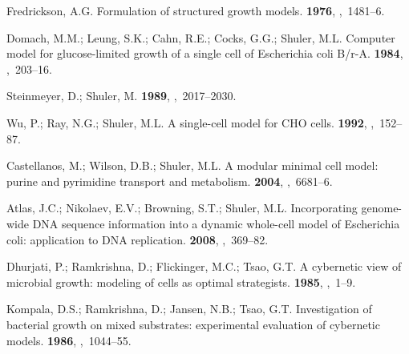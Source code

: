 \documentclass[processes,article,accept,moreauthors,pdftex,12pt,a4paper]{mdpi}
\begin{document}
\begin{thebibliography}{----}
\providecommand{\natexlab}[1]{#1}

Fredrickson, A.G.
\newblock Formulation of structured growth models.
 {\bf 1976},
,~1481--6.

Domach, M.M.; Leung, S.K.; Cahn, R.E.; Cocks, G.G.; Shuler, M.L.
\newblock Computer model for glucose-limited growth of a single cell of
  Escherichia coli B/r-A.
 {\bf 1984},
,~203--16.

Steinmeyer, D.; Shuler, M.
 {\bf 1989},
,~2017--2030.

Wu, P.; Ray, N.G.; Shuler, M.L.
\newblock A single-cell model for CHO cells.
 {\bf 1992},
,~152--87.

Castellanos, M.; Wilson, D.B.; Shuler, M.L.
\newblock A modular minimal cell model: purine and pyrimidine transport and
  metabolism.
 {\bf 2004},
,~6681--6.

Atlas, J.C.; Nikolaev, E.V.; Browning, S.T.; Shuler, M.L.
\newblock Incorporating genome-wide DNA sequence information into a dynamic
  whole-cell model of Escherichia coli: application to DNA replication.
 {\bf 2008},
,~369--82.

Dhurjati, P.; Ramkrishna, D.; Flickinger, M.C.; Tsao, G.T.
\newblock A cybernetic view of microbial growth: modeling of cells as optimal
  strategists.
 {\bf 1985},
,~1--9.

Kompala, D.S.; Ramkrishna, D.; Jansen, N.B.; Tsao, G.T.
\newblock Investigation of bacterial growth on mixed substrates: experimental
  evaluation of cybernetic models.
 {\bf 1986},
,~1044--55.


\end{thebibliography}
\end{document}
